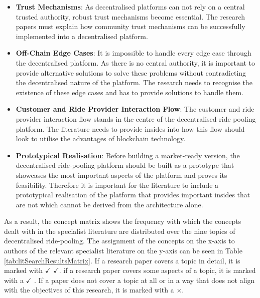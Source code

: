 \begin{itemize}
    \item \textbf{Trust Mechanisms}: As decentralised platforms can not rely on a central trusted authority, robust trust mechanisms become essential. The research papers must explain how community trust mechanisms can be successfully implemented into a decentralised platform.
    
    \item \textbf{Off-Chain Edge Cases}: It is impossible to handle every edge case through the decentralised platform. As there is no central authority, it is important to provide alternative solutions to solve these problems without contradicting the decentralised nature of the platform. The research needs to recognise the existence of these edge cases and has to provide solutions to handle them.
    
    \item \textbf{Customer and Ride Provider Interaction Flow}: The customer and ride provider interaction flow stands in the centre of the decentralised ride pooling platform. The literature needs to provide insides into how this flow should look to utilise the advantages of blockchain technology.
    
    \item \textbf{Prototypical Realisation}: Before building a market-ready version, the decentralised ride-pooling platform should be built as a prototype that showcases the most important aspects of the platform and proves its feasibility. Therefore it is important for the literature to include a prototypical realisation of the platform that provides important insides that are not which cannot be derived from the architecture alone.
\end{itemize}


As a result, the concept matrix shows the frequency with which the concepts dealt with in the specialist literature are distributed over the nine topics of decentralised ride-pooling. The assignment of the concepts on the x-axis to authors of the relevant specialist literature on the y-axis can be seen in Table \ref{tab:litSearchResultsMatrix}. If a research paper covers a topic in detail, it is marked with $\checkmark$ $\checkmark$. if a research paper covers some aspects of a topic, it is marked with a $\checkmark$ . If a paper does not cover a topic at all or in a way that does not align with the objectives of this research, it is marked with a $\times$. 


